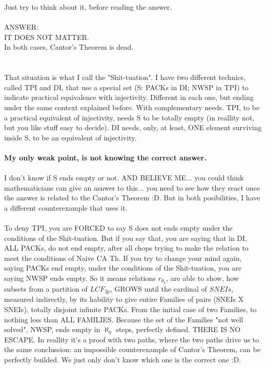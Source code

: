 		\noindent
		Just try to think about it, before reading the answer.
		\\\\
		
		\noindent
		ANSWER:\\
		IT DOES NOT MATTER.\\
		In both cases, Cantor's Theorem is dead.\\
		\\\\
		
		\noindent
		That situation is what I call the "Shit-tuation". I have two different technics, called TPI and DI, that use a special set (S: PACKs in DI; NWSP in TPI) to indicate practical equivalence with injectivity. Different in each one, but ending under the same context explained before. With complementary needs. TPI, to be a practical equivalent of injectivity, needs S to be totally empty (in reallity not, but you like stuff easy to decide). DI needs, only, at least, ONE element surviving inside S, to be an equivalent of injectivity.
		\\\\
		
		\noindent
		\textbf{My only weak point, is not knowing the correct answer.}
		\\\\
		
		\noindent
		I don't know if S ends empty or not. AND BELIEVE ME... you could think mathematicians can give an asnwer to this... you need to see how they react once the answer is related to the Cantor's Theorem :D. But in both posibilities, I have a different counterexample that uses it.
		\\\\
		
		\noindent
		To deny TPI, you are FORCED to say S does not ends empty under the conditions of the Shit-tuation. But if you say that, you are saying that in DI, ALL PACKs, do not end empty, after all chops trying to make the relation to meet the conditions of Naive CA Th. If you try to change your mind again, saying PACKs end empty, under the conditions of the Shit-tuation, you are saying NWSP ends empty. So it means relations $r_{\theta_{k}}$, are able to show, how subsets from a partition of $LCF_{2p}$, GROWS until the cardinal of $SNEIs$, measured indirectly, by its hability to give entire Families of pairs (SNEIs X SNEIs), totally disjoint infinite PACKs. From the initial case of two Families, to nothing less than ALL FAMILIES. Because the set of the Families "not well solved", NWSP, ends empty in $\aleph_{0}$ steps, perfectly defined. THERE IS NO ESCAPE. In reallity it's a proof with two paths, where the two paths drive us to the same conclussion: an impossible counterexample of Cantor's Theorem, can be perfectly builded. We just only don't know which one is the correct one :D.
		\\\\
		
